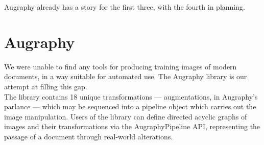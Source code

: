 \documentclass[runningheads]{llncs}
\begin{document}
Augraphy already has a story for the first three, with the fourth in planning.

\section{Augraphy}
We were unable to find any tools for producing training images of modern documents, in a way suitable for automated use. The Augraphy library is our attempt at filling this gap.\\

The library contains 18 unique transformations — augmentations, in Augraphy's parlance — which may be sequenced into a pipeline object which carries out the image manipulation. Users of the library can define directed acyclic graphs of images and their transformations via the AugraphyPipeline API, representing the passage of a document through real-world alterations.\\
\end{document}
